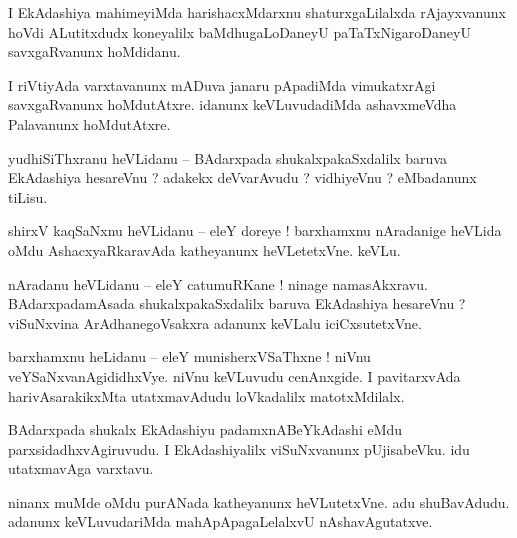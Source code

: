 \documentclass{article}
\begin{document}
\begin{mn}%
I EkAdashiya mahimeyiMda harishacxMdarxnu shaturxgaLilalxda rAjayxvanunx hoVdi ALutitxdudx 
koneyalilx baMdhugaLoDaneyU paTaTxNigaroDaneyU savxgaRvanunx hoMdidanu.
\end{mn}

\begin{mn}%
I riVtiyAda varxtavanunx mADuva janaru pApadiMda vimukatxrAgi savxgaRvanunx hoMdutAtxre. idanunx 
keVLuvudadiMda ashavxmeVdha Palavanunx hoMdutAtxre.
\end{mn}


\begin{mn}%
yudhiSiThxranu heVLidanu -- BAdarxpada shukalxpakaSxdalilx baruva EkAdashiya hesareVnu ? adakekx 
deVvarAvudu ? vidhiyeVnu ? eMbadanunx tiLisu.
\end{mn}

\begin{mn}%
shirxV kaqSaNxnu heVLidanu -- eleY doreye ! barxhamxnu nAradanige heVLida oMdu AshacxyaRkaravAda 
katheyanunx heVLetetxVne. keVLu.
\end{mn}

\begin{mn}%
nAradanu heVLidanu -- eleY catumuRKane ! ninage namasAkxravu. BAdarxpadamAsada shukalxpakaSxdalilx 
baruva EkAdashiya hesareVnu ? viSuNxvina ArAdhanegoVsakxra adanunx keVLalu iciCxsutetxVne.
\end{mn}

\begin{mn}%
barxhamxnu heLidanu -- eleY munisherxVSaThxne ! niVnu veYSaNxvanAgididhxVye. niVnu keVLuvudu 
cenAnxgide. I pavitarxvAda harivAsarakikxMta utatxmavAdudu loVkadalilx matotxMdilalx.
\end{mn}

\begin{mn}%
BAdarxpada shukalx EkAdashiyu padamxnABeYkAdashi eMdu parxsidadhxvAgiruvudu. I EkAdashiyalilx 
viSuNxvanunx pUjisabeVku. idu utatxmavAga varxtavu.
\end{mn}

\begin{mn}%
ninanx muMde oMdu purANada katheyanunx heVLutetxVne. adu shuBavAdudu. adanunx keVLuvudariMda 
mahApApagaLelalxvU nAshavAgutatxve.
\end{mn}
\end{document}
